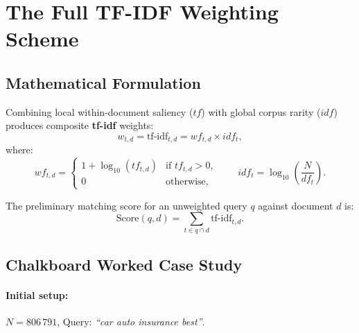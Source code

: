 \FloatBarrier
\section{The Full TF-IDF Weighting Scheme}
\label{sec:schema-tfidf-en}

\subsection{Mathematical Formulation}
Combining local within-document saliency ($tf$) with global corpus rarity ($idf$) produces composite \textbf{tf-idf} weights:
\begin{equation}
w_{t,d} = \text{tf-idf}_{t,d} = wf_{t,d} \times idf_t,
\end{equation}
where:
\begin{equation}
wf_{t,d} = \begin{cases} 1 + \log_{10}(tf_{t,d}) & \text{if } tf_{t,d} > 0, \\ 0 & \text{otherwise,} \end{cases} \qquad idf_t = \log_{10}\left( \frac{N}{df_t} \right).
\end{equation}

The preliminary matching score for an unweighted query $q$ against document $d$ is:
\begin{equation}
\text{Score}(q, d) = \sum_{t \in q \cap d} \text{tf-idf}_{t,d}.
\end{equation}

\subsection{Chalkboard Worked Case Study}

\paragraph{Initial setup:}
$N = 806\,791$, Query: \textit{``car auto insurance best''}.

\begin{table}[H]
\centering
{}
\caption{Chalkboard exercise data: term frequencies and collection statistics.}
\label{tab:board-exercise-data-en}
\end{table}

